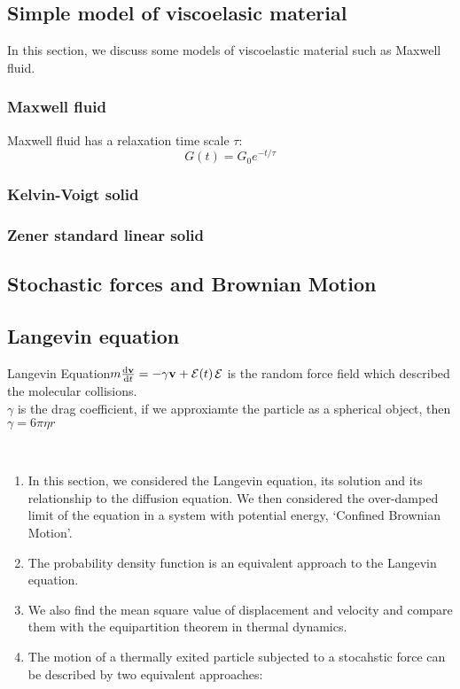 \documentclass[12pt,a4paper]{article}
\begin{document}
\subsection{Simple model of viscoelasic material}
In this section, we discuss some models of viscoelastic material such as Maxwell fluid. 
    \subsubsection{Maxwell fluid}
    Maxwell fluid has a relaxation time scale $\tau$:
    $$
        G(t) = G_0 e^{-t/\tau}
    $$
    \subsubsection{Kelvin-Voigt solid}
    \subsubsection{Zener standard linear solid}
\subsection{Stochastic forces and Brownian Motion}
\subsection{Langevin equation}
\begin{definition}
    {Langevin Equation}{$m\dv{\vb{v}}{t}=-\gamma \vb{v}+\vb{\mathcal{E}}(t)$}{$\vb{\mathcal{E}}$ is the random force field which described the molecular collisions.\\$\gamma$ is the drag coefficient, if we approxiamte the particle as a spherical object, then $\gamma=6\pi\eta r$}
\end{definition}
\\
\begin{enumerate}
    \item In this section, we considered the Langevin equation, its solution and its relationship to the diffusion equation. We then considered the over-damped limit of the equation in a system with potential energy, `Confined Brownian Motion'.
    \item The probability density function is an equivalent approach to the Langevin equation.
    \item We also find the mean square value of displacement and velocity and compare them with the equipartition theorem in thermal dynamics.
    \item The motion of a thermally exited particle subjected to a stocahstic force can be described by two equivalent approaches:
\end{enumerate}
\end{document}
